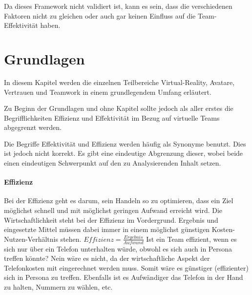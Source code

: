 \documentclass[a4paper,11pt]{article}%
\renewcommand{\\}{\vspace*{0.5\baselineskip} \newline}
\begin{document}
Da dieses Framework nicht validiert ist, kann es sein, dass die verschiedenen Faktoren nicht zu gleichen oder auch gar keinen Einfluss auf die Team-Effektivität haben.
%
%
%
%

	\newpage
\section{Grundlagen}

In diesem Kapitel werden die einzelnen Teilbereiche \dq{}Virtual-Reality\dq{}, \dq{}Avatare\dq{}, \dq{}Vertrauen\dq{} und \dq{}Teamwork\dq{} in einem grundlegendem Umfang  erläutert.

Zu Beginn der Grundlagen und ohne Kapitel sollte jedoch als aller erstes die Begrifflichkeiten \dq{}Effizienz\dq{} und \dq{}Effektivität\dq{} im Bezug auf virtuelle Teams abgegrenzt werden.

Die Begriffe Effektivität und Effizienz werden häufig als Synonyme benutzt. Dies ist jedoch nicht korrekt. Es gibt eine eindeutige Abgrenzung dieser, wobei beide einen eindeutigen Schwerpunkt auf den zu Analysierenden Inhalt setzen.

\paragraph{Effizienz}
Bei der Effizienz geht es darum, sein Handeln so zu optimieren, dass ein Ziel möglichst schnell und mit möglichst geringen Aufwand erreicht wird. Die Wirtschaftlichkeit steht bei der Effizienz im Vordergrund. Ergebnis und eingesetzte Mittel müssen dabei immer in einem möglichst günstigen Kosten-Nutzen-Verhältnis stehen.\\
$Effizienz = \frac{Ergebnis}{Aufwand}$ \\
Ist ein Team effizient, wenn es sich nur über ein Telefon unterhalten würde, obwohl es sich auch in Persona treffen könnte?
Nein wäre es nicht, da der wirtschaftliche Aspekt der Telefonkosten mit eingerechnet werden muss. Somit wäre es günstiger (effizienter) sich in Persona zu treffen. Ebenfalls ist es Aufwändiger das Telefon in der Hand zu halten, Nummern zu wählen, etc.
\end{document}
